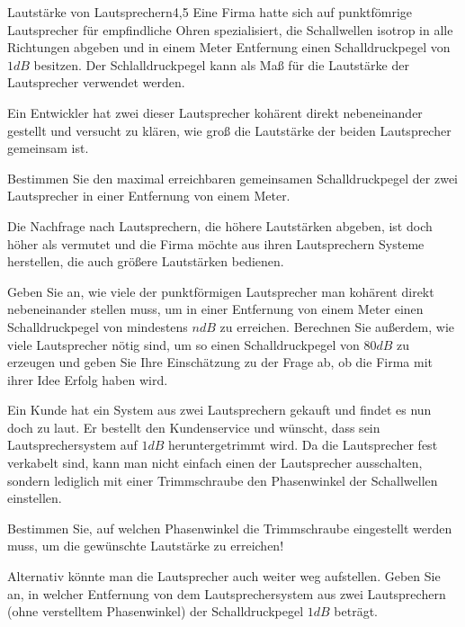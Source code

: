 \begin{problem}{Lautstärke von Lautsprechern}{4,5}
  Eine Firma hatte sich auf punktfömrige Lautsprecher für empfindliche Ohren spezialisiert, die Schallwellen isotrop in alle Richtungen abgeben und in einem Meter Entfernung einen Schalldruckpegel von $1\unit{dB}$ besitzen. Der Schlalldruckpegel kann als Maß für die Lautstärke der Lautsprecher verwendet werden.
  \begin{abcenum}
    \item Ein Entwickler hat zwei dieser Lautsprecher kohärent direkt nebeneinander gestellt und versucht zu klären, wie groß die Lautstärke der beiden Lautsprecher gemeinsam ist.

Bestimmen Sie den maximal erreichbaren gemeinsamen Schalldruckpegel der zwei Lautsprecher in einer Entfernung von einem Meter.

\item Die Nachfrage nach Lautsprechern, die höhere Lautstärken abgeben, ist doch höher als vermutet und die Firma möchte aus ihren Lautsprechern Systeme herstellen, die auch größere Lautstärken bedienen.

Geben Sie an, wie viele der punktförmigen Lautsprecher man kohärent direkt nebeneinander stellen muss, um in einer Entfernung von einem Meter einen Schalldruckpegel von mindestens $n\unit{dB}$ zu erreichen. Berechnen Sie außerdem, wie viele Lautsprecher nötig sind, um so einen Schalldruckpegel von $80\unit{dB}$ zu erzeugen und geben Sie Ihre Einschätzung zu der Frage ab, ob die Firma mit ihrer Idee Erfolg haben wird.

\item Ein Kunde hat ein System aus zwei Lautsprechern gekauft und findet es nun doch zu laut.  Er bestellt den Kundenservice und wünscht, dass sein Lautsprechersystem auf $1\unit{dB}$ heruntergetrimmt wird.  Da die Lautsprecher fest verkabelt sind, kann man nicht einfach einen der Lautsprecher ausschalten, sondern lediglich mit einer Trimmschraube den Phasenwinkel der Schallwellen einstellen.

Bestimmen Sie, auf welchen Phasenwinkel die Trimmschraube eingestellt werden muss, um die gewünschte Lautstärke zu erreichen!

Alternativ könnte man die Lautsprecher auch weiter weg aufstellen.  Geben Sie an, in welcher Entfernung von dem Lautsprechersystem aus zwei Lautsprechern (ohne verstelltem Phasenwinkel) der Schalldruckpegel $1 \unit{dB}$ beträgt.
  \end{abcenum}


\end{problem}
